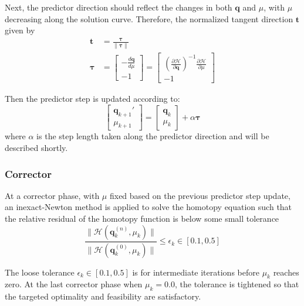 \documentclass{article}
\theoremstyle{definition}
\begin{document}
Next, the predictor direction should reflect the changes in both $\boldsymbol{q}$ and $\mu$, with $\mu$ decreasing along the solution curve. Therefore, the normalized tangent direction $\boldsymbol{t}$ given by 
\begin{equation}
\begin{aligned}
\boldsymbol{t} &= \frac{\boldsymbol{\tau}}{\lVert \boldsymbol{\tau}\rVert } \\
\boldsymbol{\tau} &= \begin{bmatrix}
-\frac{d \boldsymbol{q} }{d \mu} \\ -1 
\end{bmatrix} 
= \begin{bmatrix}
\left( \frac{\partial \mathcal{H}}{\partial \boldsymbol{q}}\right)^{-1} \frac{\partial \mathcal{H}}{\partial \mu} \\
-1 
\end{bmatrix} 
\end{aligned}
\end{equation}

Then the predictor step is updated according to:
\begin{equation}\label{eq:pred}
\begin{bmatrix}
\boldsymbol{q}_{k+1}' \\ \mu_{k+1} 
\end{bmatrix} 
=\begin{bmatrix}
\boldsymbol{q}_k \\ \mu_k 
\end{bmatrix} 
+ \alpha \boldsymbol{\tau}
\end{equation}
where $\alpha$ is the step length taken along the predictor direction and will be described shortly.  

\subsubsection{Corrector}
At a corrector phase, with $\mu$ fixed based on the previous predictor step update, an inexact-Newton method is applied to solve the homotopy equation such that the relative residual of the homotopy function is below some small tolerance
\begin{equation}\label{eq:cornt}
\frac{\lVert \mathcal{H}\left(\boldsymbol{q}_k^{(n)}, \mu_k \right) \rVert}{\lVert \mathcal{H}\left(\boldsymbol{q}_k^{(0)}, \mu_k \right) \rVert} \leq \epsilon_k \in [0.1, 0.5]
\end{equation}

The loose tolerance $\epsilon_k \in [0.1, 0.5]$ is for intermediate iterations before $\mu_k$ reaches zero. At the last corrector phase when $\mu_k = 0.0$, the tolerance is tightened so that the targeted optimality and feasibility are satisfactory.  
\end{document}
